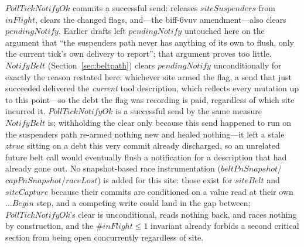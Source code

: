 \documentclass[a4paper,10pt,fleqn]{article}
\begin{document}
$PollTickNotifyOk$ commits a successful send: releases $siteSuspenders$
from $inFlight$, clears the changed flags, and---the biff-6vuv
amendment---also clears $pendingNotify$.  Earlier drafts left
$pendingNotify$ untouched here on the argument that ``the suspenders path
never has anything of its own to flush, only the current tick's own
delivery to report''; that argument proves too little.  $NotifyBelt$
(Section~\ref{sec:beltpath}) clears $pendingNotify$ unconditionally for
exactly the reason restated here: whichever site armed the flag, a send
that just succeeded delivered the \emph{current} tool description, which
reflects every mutation up to this point---so the debt the flag was
recording is paid, regardless of which site incurred it.  $PollTickNotifyOk$
is a successful send by the same measure $NotifyBelt$ is; withholding the
clear only because this send happened to run on the suspenders path
re-armed nothing new and healed nothing---it left a stale $ztrue$ sitting
on a debt this very commit already discharged, so an unrelated future
belt call would eventually flush a notification for a description that had
already gone out.  No snapshot-based race instrumentation
($beltPnSnapshot$/$capPnSnapshot$/$raceLost$) is added for this site: those
exist for $siteBelt$ and $siteCapture$ because their commits are conditioned
on a value read at their own $\dots Begin$ step, and a competing write could
land in the gap between; $PollTickNotifyOk$'s clear is unconditional, reads
nothing back, and races nothing by construction, and the
$\# inFlight \leq 1$ invariant already forbids a second critical section
from being open concurrently regardless of site.
\end{document}
